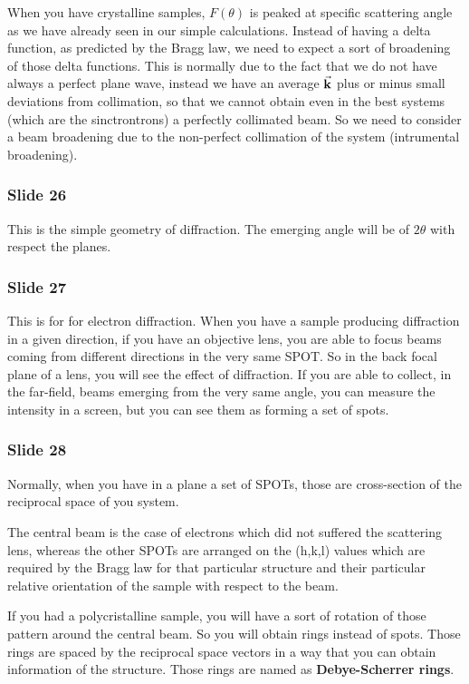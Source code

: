 \documentclass[../main/main.tex]{subfiles}
\begin{document}
When you have crystalline samples, \( F(\theta ) \) is peaked at specific scattering angle as we have already seen in our simple calculations.
Instead of having a delta function, as predicted by the Bragg law, we need to expect a sort of broadening of those delta functions.
This is normally due to the fact that we do not have always a perfect plane wave, instead we have an average \( \va{k} \) plus or minus small deviations from collimation, so that we cannot obtain even in the best systems (which are the sinctrontrons) a perfectly collimated beam. So we need to consider a beam broadening due to the non-perfect collimation of the system (intrumental broadening).

\subsubsection{Slide 26}
This is the simple geometry of diffraction.  The emerging angle will be of \( 2 \theta  \) with respect the planes.

\subsubsection{Slide 27}
This is for for electron diffraction.
When you have a sample producing diffraction in a given direction, if you have an objective lens, you are able to focus beams coming from different directions in the very same SPOT. So in the back focal plane of a lens, you will see the effect of diffraction. If you are able to collect, in the far-field, beams emerging from the very same angle, you can measure the intensity in a screen, but you can see them as forming a set of spots.

\subsubsection{Slide 28}
Normally, when you have in a plane a set of SPOTs, those are cross-section of the reciprocal space of you system.

The central beam is the case of electrons which did not suffered the scattering lens, whereas the other SPOTs are arranged on the (h,k,l) values which are required by the Bragg law for that particular structure and their particular relative orientation of the sample with respect to the beam.

If you had a polycristalline sample, you will have a sort of rotation of those pattern around the central beam. So you will obtain rings instead of spots. Those rings are spaced by the reciprocal space vectors in a way that you can obtain information of the structure.
Those rings are named as \textbf{Debye-Scherrer rings}.
\end{document}
